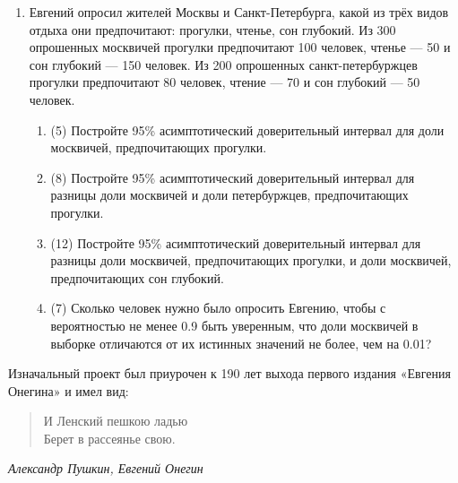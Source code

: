 \begin{enumerate}
\item  Евгений опросил жителей Москвы и Санкт-Петербурга,
  какой из трёх видов отдыха они предпочитают: прогулки, чтенье, сон глубокий. 
  Из 300 опрошенных москвичей прогулки предпочитают 100 человек, чтенье — 50 и сон глубокий — 150 человек.
  Из 200 опрошенных санкт-петербуржцев прогулки предпочитают 80 человек, чтение — 70 и сон глубокий — 50 человек. 
  
  \begin{enumerate}
      \item (5) Постройте 95\% асимптотический доверительный интервал для доли москвичей, предпочитающих прогулки. 
      \item (8) Постройте 95\% асимптотический доверительный интервал для разницы  доли москвичей и доли петербуржцев, предпочитающих прогулки.
      \item (12) Постройте 95\% асимптотический доверительный интервал для разницы  доли москвичей, предпочитающих прогулки, и 
      доли москвичей, предпочитающих сон глубокий.
      \item (7) Сколько человек нужно было опросить Евгению, чтобы с вероятностью не менее 0.9 быть уверенным, что доли москвичей в выборке отличаются от их истинных значений не более, чем на 0.01? 
  \end{enumerate}
  
\end{enumerate}


Изначальный проект был приурочен к 190 лет выхода первого издания «Евгения Онегина» и имел вид:

\begin{minipage}{0.6\textwidth}
  \begin{quote}
      И Ленский пешкою ладью \\
      Берет в рассеянье свою. 
  \end{quote}
  \begin{flushright}
      \textit{Александр Пушкин, Евгений Онегин}
  \end{flushright}
  \end{minipage}
  

